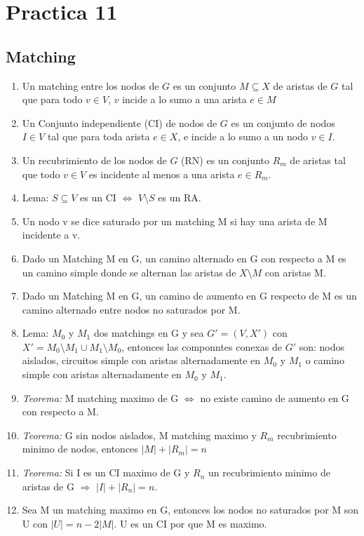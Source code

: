 \section{Practica 11}
\subsection{Matching}
\begin{enumerate}
\item Un matching entre los nodos de $G$ es un conjunto $M \subseteq X$ de aristas de $G$ tal que para todo $v \in V$, $v$ incide a lo sumo a una arista $e \in M$
\item Un Conjunto independiente (CI) de nodos de $G$ es un conjunto de nodos $I \in V$ tal que para toda arista $e \in X$, e incide a lo sumo a un nodo $v \in I$.
\item Un recubrimiento de los nodos de $G$ (RN) es un conjunto $R_{m}$ de aristas tal que todo $v \in V$ es incidente al menos a una arista $e \in R_{m}$.
\item Lema: $S \subseteq V$ es un CI $\iff$ $V \setminus S$ es un RA.
\item Un nodo v se dice saturado por un matching M si hay una arista de M incidente a v.
\item Dado un Matching M en G, un camino alternado en G con respecto a M es un camino simple donde se alternan las aristas de $X \setminus M$ con aristas M.
\item Dado un Matching M en G, un camino de aumento en G respecto de M es un camino alternado entre nodos no saturados por M.
\item Lema: $M_{0}$ y $M_{1}$ dos matchings en G y sea $G'=(V,X')$ con $X'=M_{0} \setminus M_{1} \cup M_{1} \setminus M_{0}$, entonces las componntes conexas de $G'$ son: nodos aislados, circuitos simple con aristas alternadamente en $M_{0}$ y $M_{1}$ o camino simple con aristas alternadamente en $M_{0}$ y $M_{1}$.
\item \textit{Teorema:} M matching maximo de G $\iff$ no existe camino de aumento en G con respecto a M.
\item \textit{Teorema:} G sin nodos aislados, M matching maximo y $R_{m}$ recubrimiento minimo de nodos, entonces $|M|+|R_{m}|=n$
\item \textit{Teorema:} Si I es un CI maximo de G y $R_{n}$ un recubrimiento minimo de aristas de G $\Rightarrow$ $|I|+|R_{n}|=n$.
\item Sea M un matching maximo en G, entonces los nodos no saturados por M son U con $|U|=n-2|M|$. U es un CI por que M es maximo.
\end{enumerate}
